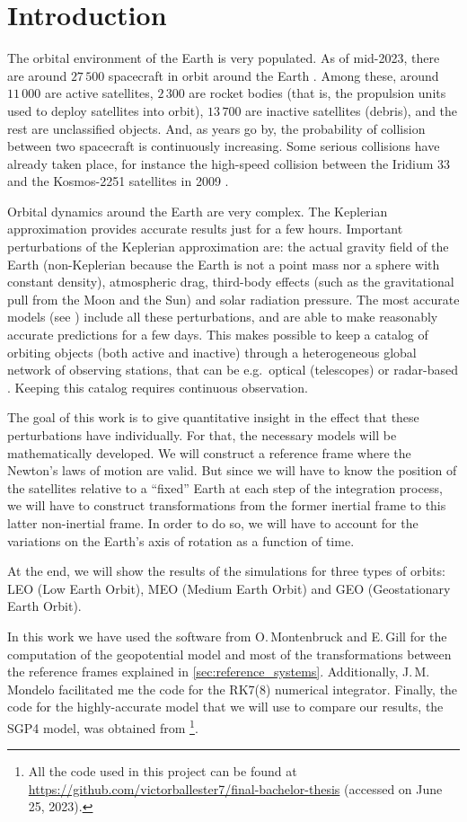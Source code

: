 \documentclass[../main.tex]{subfiles}
\begin{document}
\section{Introduction}\label{sec:intro}

The orbital environment of the Earth is very populated. As of mid-2023, there are around $27\,500$ spacecraft in orbit around the Earth \cite{web:spacetrack}. Among these, around $11\,000$ are active satellites, $2\,300$ are rocket bodies (that is, the propulsion units used to deploy satellites into orbit), $13\,700$ are inactive satellites (debris), and the rest are unclassified objects. And, as years go by, the probability of collision between two spacecraft is continuously increasing. Some serious collisions have already taken place, for instance the high-speed collision between the Iridium 33 and the Kosmos-2251 satellites in 2009 \cite{wiki:collision}.

Orbital dynamics around the Earth are very complex. The Keplerian approximation provides accurate results just for a few hours. Important perturbations of the Keplerian approximation are: the actual gravity field of the Earth (non-Keplerian because the Earth is not a point mass nor a sphere with constant density), atmospheric drag, third-body effects (such as the gravitational pull from the Moon and the Sun) and solar radiation pressure. The most accurate models (see \cite{sgp4OrbitDet}) include all these perturbations, and are able to make reasonably accurate predictions for a few days. This makes possible to keep a catalog of orbiting objects (both active and inactive) through a heterogeneous global network of observing stations, that can be e.g.\ optical (telescopes) or radar-based \cite{web:spacetrack,web:celestrak}. Keeping this catalog requires continuous observation.

The goal of this work is to give quantitative insight in the effect that these perturbations have individually. For that, the necessary models will be mathematically developed. We will construct a reference frame where the Newton's laws of motion are valid. But since we will have to know the position of the satellites relative to a ``fixed'' Earth at each step of the integration process, we will have to construct transformations from the former inertial frame to this latter non-inertial frame. In order to do so, we will have to account for the variations on the Earth's axis of rotation as a function of time.

At the end, we will show the results of the simulations for three types of orbits: LEO (Low Earth Orbit), MEO (Medium Earth Orbit) and GEO (Geostationary Earth Orbit).

In this work we have used the software from O.\,Montenbruck and E.\,Gill \cite{montenbruck} for the computation of the geopotential model and most of the transformations between the reference frames explained in \cref{sec:reference_systems}. Additionally, J.\,M.\,Mondelo facilitated me the code for the RK7(8) numerical integrator. Finally, the code for the highly-accurate model that we will use to compare our results, the SGP4 model, was obtained from \cite{code_sgp4}\footnote{All the code used in this project can be found at \url{https://github.com/victorballester7/final-bachelor-thesis} (accessed on June 25, 2023).}.
\end{document}
